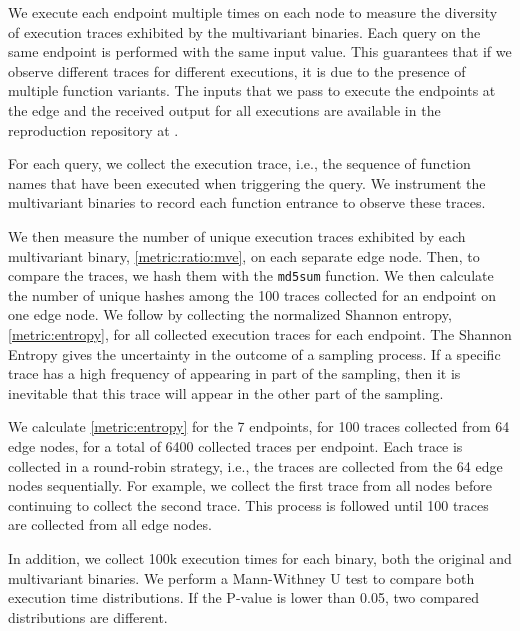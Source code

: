 We execute each endpoint multiple times on each node to measure the diversity of execution traces exhibited by the multivariant binaries. Each query on the same endpoint is performed with the same input value. This guarantees that if we observe different traces for different executions, it is due to the presence of multiple function variants. 
The inputs that we pass to execute the endpoints at the edge and the received output for all executions are available in the reproduction repository at . 

For each query, we collect the execution trace, i.e.,  the sequence of function names that have been executed when triggering the query.
We instrument the multivariant binaries to record each function entrance to observe these traces.

We then measure the number of unique execution traces exhibited by each multivariant binary, \autoref{metric:ratio:mve}, on each separate edge node. Then, to compare the traces, we hash them with the \texttt{md5sum} function.
We then calculate the number of unique hashes among the 100 traces collected for an endpoint on one edge node.
We follow by collecting the normalized Shannon entropy, \autoref{metric:entropy}, for all collected execution traces for each endpoint.
The Shannon Entropy gives the uncertainty in the outcome of a sampling process.
If a specific trace has a high frequency of appearing in part of the sampling, then it is inevitable that this trace will appear in the other part of the sampling.


We calculate \autoref{metric:entropy} for the 7 endpoints, for 100 traces collected from 64 edge nodes, for a total of 6400 collected traces per endpoint.
Each trace is collected in a round-robin strategy, i.e., the traces are collected from the 64 edge nodes sequentially.
For example, we collect the first trace from all nodes before continuing to collect the second trace.
This process is followed until 100 traces are collected from all edge nodes.


In addition, we collect 100k execution times for each binary, both the original and multivariant binaries.
We perform a Mann-Withney U test \cite{mann1947} to compare both execution time distributions. 
If the P-value is lower than 0.05, two compared distributions are different.
